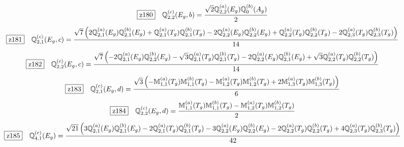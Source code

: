 \documentclass[fleqn,10pt,landscape]{jsarticle}
\begin{document}
\begin{dmath*}
\hspace*{3mm}\fbox{z180}\quad \mathbb{Q}_{2,2}^{(c)}(E_{g},b)=\frac{\sqrt{2} \mathbb{Q}_{2,2}^{(a)}(E_{g}) \mathbb{Q}_{0}^{(b)}(A_{g})}{2}
\end{dmath*}
\begin{dmath*}
\hspace*{3mm}\fbox{z181}\quad \mathbb{Q}_{2,1}^{(c)}(E_{g},c)=\frac{\sqrt{7} \left(2 \mathbb{Q}_{2,1}^{(a)}(E_{g}) \mathbb{Q}_{2,1}^{(b)}(E_{g}) + \mathbb{Q}_{2,1}^{(a)}(T_{g}) \mathbb{Q}_{2,1}^{(b)}(T_{g}) - 2 \mathbb{Q}_{2,2}^{(a)}(E_{g}) \mathbb{Q}_{2,2}^{(b)}(E_{g}) + \mathbb{Q}_{2,2}^{(a)}(T_{g}) \mathbb{Q}_{2,2}^{(b)}(T_{g}) - 2 \mathbb{Q}_{2,3}^{(a)}(T_{g}) \mathbb{Q}_{2,3}^{(b)}(T_{g})\right)}{14}
\end{dmath*}
\begin{dmath*}
\hspace*{3mm}\fbox{z182}\quad \mathbb{Q}_{2,2}^{(c)}(E_{g},c)=\frac{\sqrt{7} \left(- 2 \mathbb{Q}_{2,1}^{(a)}(E_{g}) \mathbb{Q}_{2,2}^{(b)}(E_{g}) - \sqrt{3} \mathbb{Q}_{2,1}^{(a)}(T_{g}) \mathbb{Q}_{2,1}^{(b)}(T_{g}) - 2 \mathbb{Q}_{2,2}^{(a)}(E_{g}) \mathbb{Q}_{2,1}^{(b)}(E_{g}) + \sqrt{3} \mathbb{Q}_{2,2}^{(a)}(T_{g}) \mathbb{Q}_{2,2}^{(b)}(T_{g})\right)}{14}
\end{dmath*}
\begin{dmath*}
\hspace*{3mm}\fbox{z183}\quad \mathbb{Q}_{2,1}^{(c)}(E_{g},d)=\frac{\sqrt{3} \left(- \mathbb{M}_{1,1}^{(a)}(T_{g}) \mathbb{M}_{1,1}^{(b)}(T_{g}) - \mathbb{M}_{1,2}^{(a)}(T_{g}) \mathbb{M}_{1,2}^{(b)}(T_{g}) + 2 \mathbb{M}_{1,3}^{(a)}(T_{g}) \mathbb{M}_{1,3}^{(b)}(T_{g})\right)}{6}
\end{dmath*}
\begin{dmath*}
\hspace*{3mm}\fbox{z184}\quad \mathbb{Q}_{2,2}^{(c)}(E_{g},d)=\frac{\mathbb{M}_{1,1}^{(a)}(T_{g}) \mathbb{M}_{1,1}^{(b)}(T_{g}) - \mathbb{M}_{1,2}^{(a)}(T_{g}) \mathbb{M}_{1,2}^{(b)}(T_{g})}{2}
\end{dmath*}
\begin{dmath*}
\hspace*{3mm}\fbox{z185}\quad \mathbb{Q}_{4,1}^{(c)}(E_{g})=\frac{\sqrt{21} \left(3 \mathbb{Q}_{2,1}^{(a)}(E_{g}) \mathbb{Q}_{2,1}^{(b)}(E_{g}) - 2 \mathbb{Q}_{2,1}^{(a)}(T_{g}) \mathbb{Q}_{2,1}^{(b)}(T_{g}) - 3 \mathbb{Q}_{2,2}^{(a)}(E_{g}) \mathbb{Q}_{2,2}^{(b)}(E_{g}) - 2 \mathbb{Q}_{2,2}^{(a)}(T_{g}) \mathbb{Q}_{2,2}^{(b)}(T_{g}) + 4 \mathbb{Q}_{2,3}^{(a)}(T_{g}) \mathbb{Q}_{2,3}^{(b)}(T_{g})\right)}{42}
\end{dmath*}
\end{document}
